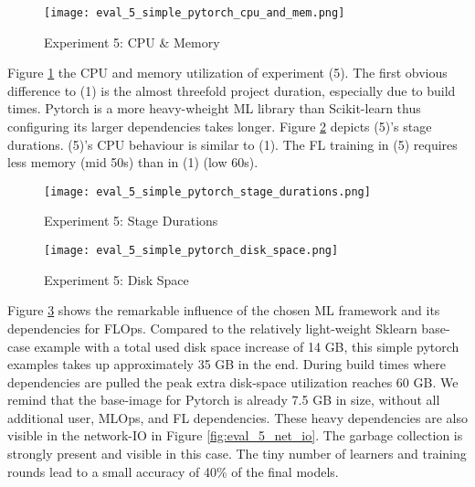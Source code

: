 \begin{figure}[H]
    \begin{adjustwidth}{-0.2\paperwidth}{-0.2\paperwidth}
        \centering
        \texttt{[image: eval\_5\_simple\_pytorch\_cpu\_and\_mem.png]}
        \caption{Experiment 5: CPU \& Memory}
        \label{fig:eval_5_cpu_mem}
    \end{adjustwidth}
\end{figure}

Figure \ref{fig:eval_5_cpu_mem} the CPU and memory utilization of experiment (5).
The first obvious difference to (1) is the almost threefold project duration, especially due to build times.
Pytorch is a more heavy-wheight ML library than Scikit-learn thus configuring its larger dependencies takes longer.
Figure \ref{fig:eval_5_simplest_stage_durations} depicts (5)'s stage durations.
(5)'s CPU behaviour is similar to (1).
The FL training in (5) requires less memory (mid 50s) than in (1) (low 60s).
\begin{figure}[H]
    \begin{adjustwidth}{-0.2\paperwidth}{-0.2\paperwidth}
        \centering
        \texttt{[image: eval\_5\_simple\_pytorch\_stage\_durations.png]}
        \caption{Experiment 5: Stage Durations}
        \label{fig:eval_5_simplest_stage_durations}
    \end{adjustwidth}
\end{figure}

\begin{figure}[H]
    \begin{adjustwidth}{-0.2\paperwidth}{-0.2\paperwidth}
        \centering
        \texttt{[image: eval\_5\_simple\_pytorch\_disk\_space.png]}
        \caption{Experiment 5: Disk Space}
        \label{fig:eval_5_disk_space}
    \end{adjustwidth}
\end{figure}

Figure \ref{fig:eval_5_disk_space} shows the remarkable influence of the chosen ML framework and its dependencies for FLOps.
Compared to the relatively light-weight Sklearn base-case example with a total used disk space increase of 14 GB, this simple pytorch examples takes up approximately 35 GB in the end.
During build times where dependencies are pulled the peak extra disk-space utilization reaches 60 GB.
We remind that the base-image for Pytorch is already 7.5 GB in size, without all additional user, MLOps, and FL dependencies.
These heavy dependencies are also visible in the network-IO in Figure \ref{fig:eval_5_net_io}.
The garbage collection is strongly present and visible in this case.
The tiny number of learners and training rounds lead to a small accuracy of 40\% of the final models.

